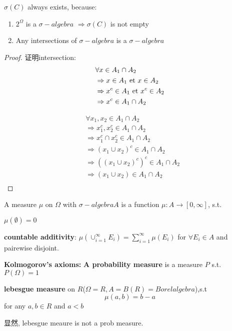 \documentclass{article}
\begin{document}
$\sigma(C)$ always exists, because:
\begin{enumerate}
\item $2^{\Omega}$ is a $\sigma-algebra$ $\Rightarrow \sigma(C)$ is not empty
\item Any intersections of $\sigma-algebra$ is a $\sigma-algebra$
\end{enumerate}
\begin{proof}
证明intersection:\\
$$
\begin{aligned}
& \forall x \in A_1 \cap A_2\\
& \Rightarrow x \in A_1  \textrm{ et } x \in A_2\\
& \Rightarrow x^c \in A_1 \textrm{ et } x^c \in A_2\\
& \Rightarrow x^c \in A_1 \cap A_2\\
\end{aligned}
$$

$$
\begin{aligned}
& \forall x_1, x_2 \in A_1 \cap A_2\\
& \Rightarrow x_1^c, x_2^c \in A_1 \cap A_2\\
& \Rightarrow x_1^c \cap x_2^c \in A_1 \cap A_2\\
& \Rightarrow (x_1 \cup x_2)^c \in A_1 \cap A_2\\
& \Rightarrow ((x_1 \cup x_2)^c)^c \in A_1 \cap A_2\\
& \Rightarrow (x_1 \cup x_2) \in A_1 \cap A_2\\
\end{aligned}
$$
\end{proof}

\begin{definition}
A measure $\mu$ on $\Omega$ with $\sigma-algebra A$ is a function $\mu: A \rightarrow [0, \infty]$, s.t.
\item $\mu(\emptyset) = 0$
\item \textbf{countable additivity}: $\mu(\cup_{i=1}^{\infty} E_i) = \sum_{i=1}^{\infty}\mu(E_i)$ for $\forall E_i \in A$ and pairewise disjoint.
\end{definition}

\begin{definition}
\textbf{Kolmogorov's axioms: }
\textbf{A probability measure} is a measure $P$ s.t. $P(\Omega) = 1$
\end{definition}

\begin{definition}
\textbf{lebesgue measure} on $R$($\Omega = R, A = B(R) = Borel algebra$),s.t
$$\mu(a,b) = b -a$$ for any $a,b \in R$ and $a < b$
\end{definition}
显然, lebesgue meaure is not a prob measure.
\end{document}
